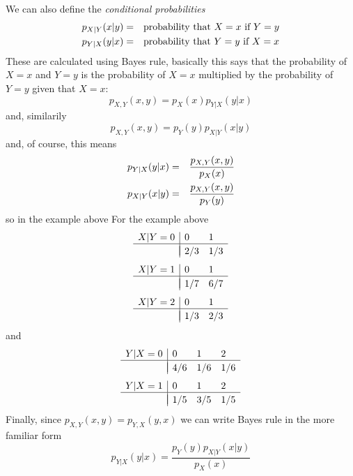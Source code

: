 \documentclass[12pt]{article}
\begin{document}
We can also define the {\sl conditional probabilities}
\begin{eqnarray}
p_{X|Y}(x|y)&=&\mbox{probability that $X=x$ if $Y=y$}\cr
p_{Y|X}(y|x)&=&\mbox{probability that $Y=y$ if $X=x$}
\end{eqnarray}
These are calculated using Bayes rule, basically this says that the probability of $X=x$ and $Y=y$ is the probability of $X=x$ multiplied by the probability of $Y=y$ given that $X=x$:
\begin{equation}
p_{X,Y}(x,y)=p_X(x)p_{Y|X}(y|x)
\end{equation}
and, similarily
\begin{equation}
p_{X,Y}(x,y)=p_Y(y)p_{X|Y}(x|y)
\end{equation}
and, of course, this means
\begin{eqnarray}
p_{Y|X}(y|x)&=&\frac{p_{X,Y}(x,y)}{p_X(x)}\cr
p_{X|Y}(x|y)&=&\frac{p_{X,Y}(x,y)}{p_Y(y)}
\end{eqnarray}
so in the example above
For the example above
\begin{equation}
\begin{array}{l|ll}
X|Y=0&0&1\\
\hline\\[-10pt]
 &2/3&1/3
\end{array}
\end{equation}
\begin{equation}
\begin{array}{l|ll}
X|Y=1&0&1\\
\hline\\[-10pt]
 &1/7&6/7
\end{array}
\end{equation}
\begin{equation}
\begin{array}{l|ll}
X|Y=2&0&1\\
\hline\\[-10pt]
 &1/3&2/3
\end{array}
\end{equation}
and
\begin{equation}
\begin{array}{l|lll}
Y|X=0&0&1&2\\
\hline\\[-10pt]
&4/6&1/6&1/6
\end{array}
\end{equation}
\begin{equation}
\begin{array}{l|lll}
Y|X=1&0&1&2\\
\hline\\[-10pt]
&1/5&3/5&1/5
\end{array}
\end{equation}
Finally, since $p_{X,Y}(x,y)=p_{Y,X}(y,x)$ we can write Bayes rule in the more familiar form
\begin{equation}
p_{Y|X}(y|x)=\frac{p_Y(y)p_{X|Y}(x|y)}{p_X(x)}
\end{equation}
\end{document}
